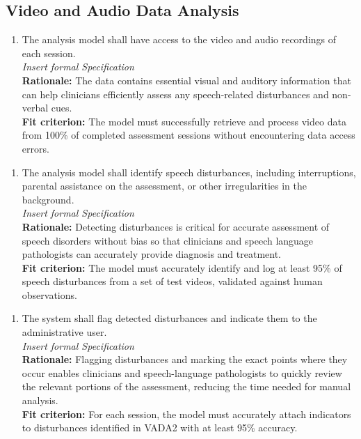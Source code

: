 \documentclass[12pt]{article}
\begin{document}
\subsection{Video and Audio Data Analysis}
\begin{enumerate}[{FR-VADA}4. ]
  \item The analysis model shall have access to the video and audio recordings of each session.\\
  \textit{Insert formal Specification}\\
  \textbf{Rationale: }The data contains essential visual and auditory information that can help clinicians 
  efficiently assess any speech-related disturbances and non-verbal cues.\\
  \textbf{Fit criterion: }The model must successfully retrieve and process video data from 100\% of 
  completed assessment sessions without encountering data access errors.
\end{enumerate}
\begin{enumerate}[{FR-VADA}2. ]
  \item The analysis model shall identify speech disturbances, including interruptions, parental 
  assistance on the assessment, or other irregularities in the background.\\
  \textit{Insert formal Specification}\\
  \textbf{Rationale: }Detecting disturbances is critical for accurate assessment of speech disorders without 
  bias so that clinicians and speech language pathologists can accurately provide diagnosis and treatment.\\
  \textbf{Fit criterion: }The model must accurately identify and log at least 95\% of speech disturbances 
  from a set of test videos, validated against human observations.
\end{enumerate}
\begin{enumerate}[{FR-VADA}3. ]
  \item The system shall flag detected disturbances and indicate them to the administrative user.\\
  \textit{Insert formal Specification}\\
  \textbf{Rationale: }Flagging disturbances and marking the exact points where they occur enables clinicians and 
  speech-language pathologists to quickly review the relevant portions of the assessment, reducing the time needed 
  for manual analysis.\\
  \textbf{Fit criterion: }For each session, the model must accurately attach indicators to disturbances
  identified in VADA2 with at least 95\% accuracy.
\end{enumerate}
\end{document}
